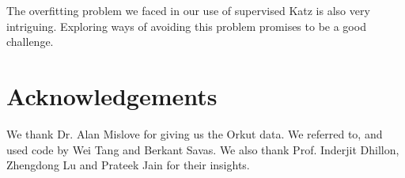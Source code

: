 \documentclass{report}
\begin{document}
The overfitting problem we faced in our use of supervised Katz is also very intriguing. Exploring ways of avoiding this problem promises to be a good challenge.

\section{Acknowledgements}
We thank Dr. Alan Mislove \cite{mislove-2007-socialnetworks} for giving us the Orkut data. We referred to, and used code by Wei Tang and Berkant Savas. We also thank Prof. Inderjit Dhillon, Zhengdong Lu and Prateek Jain for their insights.



\end{document}
